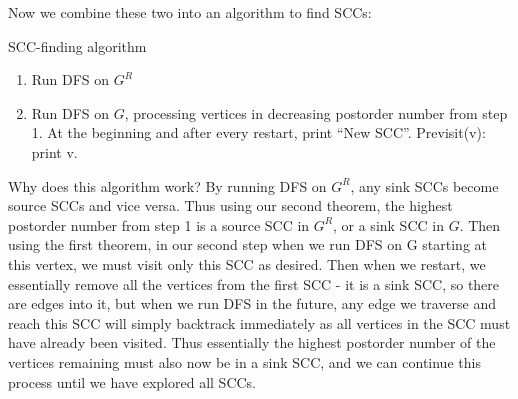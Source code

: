 \documentclass{article}
\begin{document}
Now we combine these two into an algorithm to find SCCs:

\begin{strategy}{SCC-finding algorithm}
\begin{enumerate}
    \item Run DFS on $G^R$
    \item Run DFS on $G$, processing vertices in decreasing postorder number from step 1. At the beginning and after every restart, print “New SCC”. Previsit(v): print v.
\end{enumerate}
\end{strategy}
    
Why does this algorithm work? By running DFS on $G^R$, any sink SCCs become source SCCs and vice versa. Thus using our second theorem, the highest postorder number from step 1 is a source SCC in $G^R$, or a sink SCC in $G$. Then using the first theorem, in our second step when we run DFS on G starting at this vertex, we must visit only this SCC as desired. Then when we restart, we essentially remove all the vertices from the first SCC - it is a sink SCC, so there are edges into it, but when we run DFS in the future, any edge we traverse and reach this SCC will simply backtrack immediately as all vertices in the SCC must have already been visited. Thus essentially the highest postorder number of the vertices remaining must also now be in a sink SCC, and we can continue this process until we have explored all SCCs.
\end{document}

